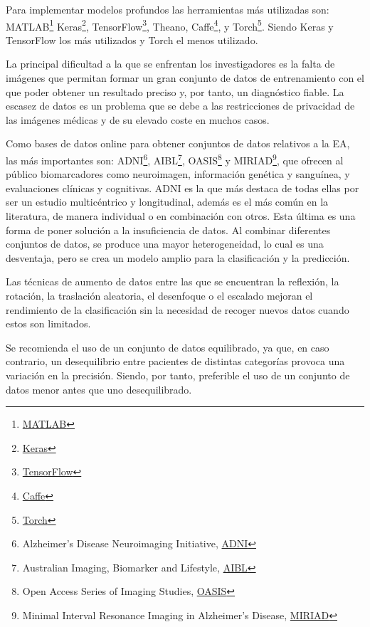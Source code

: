 Para implementar modelos profundos las herramientas más utilizadas son:
MATLAB\footnote{\href{https://www.mathworks.com/products/matlab.html}{MATLAB}}
Keras\footnote{\href{https://keras.io/}{Keras}},
TensorFlow\footnote{\href{https://www.tensorflow.org/}{TensorFlow}},
Theano,
Caffe\footnote{\href{https://caffe.berkeleyvision.org/}{Caffe}},
y Torch\footnote{\href{http://torch.ch/}{Torch}}.
Siendo Keras y TensorFlow los más utilizados y Torch el menos utilizado.

La principal dificultad a la que se enfrentan los investigadores es la falta de imágenes que permitan formar un gran
conjunto de datos de entrenamiento con el que poder obtener un resultado preciso y, por tanto, un diagnóstico fiable.
La escasez de datos es un problema que se debe a las restricciones de privacidad de las imágenes médicas y de su elevado
coste en muchos casos.

Como bases de datos online para obtener conjuntos de datos relativos a la EA, las más importantes son:
ADNI\footnote{Alzheimer’s Disease Neuroimaging Initiative, \href{https://adni.loni.usc.edu/}{ADNI}},
AIBL\footnote{Australian Imaging, Biomarker and Lifestyle, \href{https://aibl.csiro.au/}{AIBL}},
OASIS\footnote{Open Access Series of Imaging Studies, \href{https://www.oasis-brains.org/}{OASIS}}
y MIRIAD\footnote{Minimal Interval Resonance Imaging in Alzheimer's Disease,
    \href{https://www.ucl.ac.uk/drc/research/research-methods/minimal-interval-resonance-imaging-alzheimers-disease-miriad}{MIRIAD}},
que ofrecen al público biomarcadores como neuroimagen, información genética y sanguínea, y evaluaciones
clínicas y cognitivas.
ADNI es la que más destaca de todas ellas por ser un estudio multicéntrico y longitudinal, además es el más común en la
literatura, de manera individual o en combinación con otros.
Esta última es una forma de poner solución a la insuficiencia de datos.
Al combinar diferentes conjuntos de datos, se produce una mayor heterogeneidad, lo cual es una desventaja, pero se crea
un modelo amplio para la clasificación y la predicción.

Las técnicas de aumento de datos entre las que se encuentran la reflexión, la rotación, la traslación aleatoria, el
desenfoque o el escalado mejoran el rendimiento de la clasificación sin la necesidad de recoger nuevos datos cuando
estos son limitados.

Se recomienda el uso de un conjunto de datos equilibrado, ya que, en caso contrario, un desequilibrio entre pacientes de
distintas categorías provoca una variación en la precisión.
Siendo, por tanto, preferible el uso de un conjunto de datos menor antes que uno desequilibrado.




